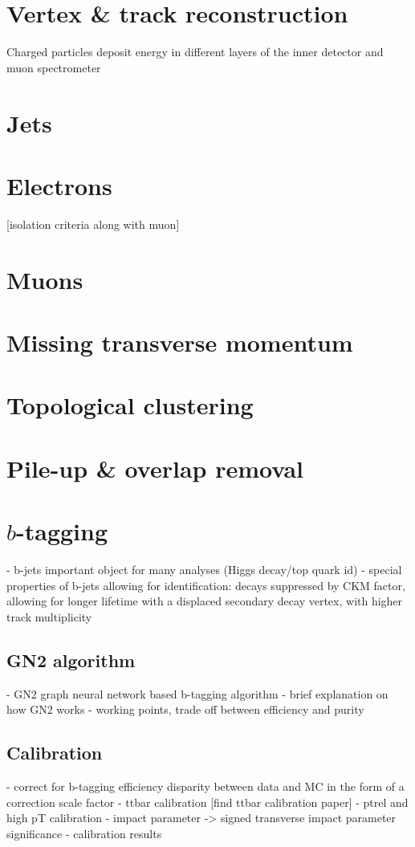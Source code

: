 \documentclass[../thesis.tex]{subfiles}
\begin{document}
\vspace{-1\baselineskip}

\section{Vertex \& track reconstruction}
Charged particles deposit energy in different layers of the inner detector and muon spectrometer\\

\section{Jets}
\section{Electrons}
[isolation criteria along with muon]
\section{Muons}
\section{Missing transverse momentum}
\section{Topological clustering}
\section{Pile-up \& overlap removal}


\section{$b$-tagging}
- b-jets important object for many analyses (Higgs decay/top quark id)
- special properties of b-jets allowing for identification: decays suppressed by CKM factor, allowing for longer lifetime with a displaced secondary decay vertex, with higher track multiplicity
\subsection{GN2 algorithm}
- GN2 graph neural network based b-tagging algorithm
- brief explanation on how GN2 works
- working points, trade off between efficiency and purity
\subsection*{Calibration}
- correct for b-tagging efficiency disparity between data and MC in the form of a correction scale factor
- ttbar calibration
[find ttbar calibration paper]
- ptrel and high pT calibration
- impact parameter -> signed transverse impact parameter significance
- calibration results
\end{document}
